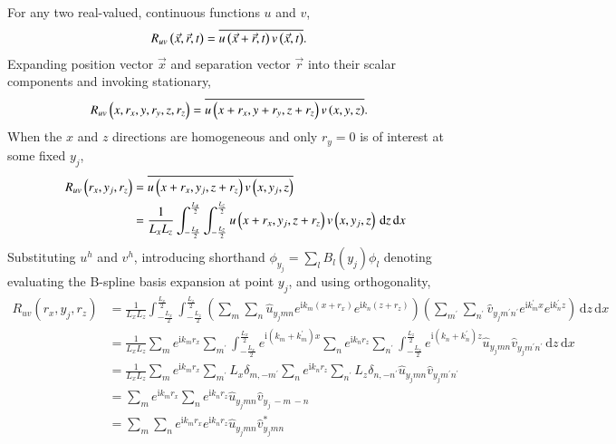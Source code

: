 \documentclass[letterpaper,11pt,nointlimits,reqno]{amsart}
\newcommand{\ii}{\ensuremath{\mathrm{i}}}
\begin{document}
For any two real-valued, continuous functions $u$ and $v$,
\begin{align}
R_{uv} \left( \vec{x}, \vec{r}, t \right)
  &=   \overline{%
       u \left( \vec{x} + \vec{r}, t \right)
       v \left( \vec{x}          , t \right)
       }.
\end{align}
Expanding position vector $\vec{x}$ and separation vector $\vec{r}$ into their
scalar components and invoking stationary,
\begin{align}
R_{uv} \left( x, r_x, y, r_y, z, r_z \right)
  &=   \overline{%
       u \left( x + r_x, y + r_y, z + r_z \right)
       v \left( x      , y      , z       \right)
       }.
\end{align}
When the $x$ and $z$ directions are homogeneous and only $r_y=0$ is of interest
at some fixed $y_j$,
\begin{align}
R_{uv} \left( r_x, y_j, r_z \right)
  &=   \overline{%
       u \left( x + r_x, y_j, z + r_z \right)
       v \left( x      , y_j, z       \right)
       }
\\
  &= \frac{1}{L_x L_z}
     \int_{-\frac{L_x}{2}}^{\frac{L_x}{2}}
     \int_{-\frac{L_z}{2}}^{\frac{L_z}{2}}
       u \left( x + r_x, y_j, z + r_z \right)
       v \left( x      , y_j, z       \right)
     \,\mathrm{d}z
     \,\mathrm{d}x
\end{align}
Substituting $u^h$ and $v^h$, introducing shorthand $\phi_{y_j} = \sum_{l}
B_l\left(y_j\right) \phi_l$ denoting evaluating the B-spline basis expansion at
point $y_j$, and using orthogonality,
\begin{align}
R_{uv} \left( r_x, y_j, r_z \right)
  &= \frac{1}{L_x L_z}
     \int_{-\frac{L_x}{2}}^{\frac{L_x}{2}}
     \int_{-\frac{L_z}{2}}^{\frac{L_z}{2}}
        \left(
         \sum_{m}\sum_{n}
         \hat{u}_{y_j m n}
         e^{\ii k_m \left(x+r_x\right)}e^{\ii k_n \left(z+r_z\right)}
       \right)
       \left(
         \sum_{m^\prime}\sum_{n^\prime}
         \hat{v}_{y_j m^\prime n^\prime}
         e^{\ii k_m^\prime x}e^{\ii k_n^\prime z}
       \right)
     \,\mathrm{d}z
     \,\mathrm{d}x
\\
  &= \frac{1}{L_x L_z}
     \sum_{m}
     e^{\ii k_m r_x}
     \sum_{m^\prime}
     \int_{-\frac{L_x}{2}}^{\frac{L_x}{2}}
     e^{\ii (k_m+k_m^\prime) x}
     \sum_{n}
     e^{\ii k_n r_z}
     \sum_{n^\prime}
     \int_{-\frac{L_z}{2}}^{\frac{L_z}{2}}
     e^{\ii (k_n+k_n^\prime) z}
     \hat{u}_{y_j m n}
     \hat{v}_{y_j m^\prime n^\prime}
     \,\mathrm{d}z
     \,\mathrm{d}x
\\
  &= \frac{1}{L_x L_z}
     \sum_{m}
     e^{\ii k_m r_x}
     \sum_{m^\prime}
     L_x
     \delta_{m,-m^\prime}
     \sum_{n}
     e^{\ii k_n r_z}
     \sum_{n^\prime}
     L_z
     \delta_{n,-n^\prime}
     \hat{u}_{y_j m n}
     \hat{v}_{y_j m^\prime n^\prime}
\\
  &=
     \sum_{m}
     e^{\ii k_m r_x}
     \sum_{n}
     e^{\ii k_n r_z}
     \hat{u}_{y_j m n}
     \hat{v}_{y_j\,-m\,-n}
\\
  &=
     \sum_{m}
     \sum_{n}
     e^{\ii k_m r_x}
     e^{\ii k_n r_z}
     \hat{u}_{y_j m n}
     \hat{v}^{\ast}_{y_j m n}
\end{align}
\end{document}
